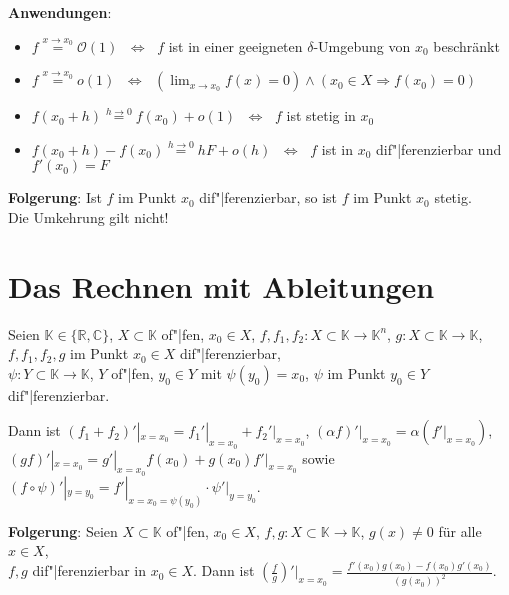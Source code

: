 \linie

\textbf{Anwendungen}:
\begin{itemize}
    \item $f \overset{x \to x_0}{=} \mathcal{O}(1)$
    $\;\Leftrightarrow\;$ $f$ ist in einer geeigneten $\delta$-Umgebung
    von $x_0$ beschränkt

    \item $f \overset{x \to x_0}{=} o(1)$
    $\;\Leftrightarrow\;$ $(\lim_{x \to x_0} f(x) = 0) \land
    (x_0 \in X \Rightarrow f(x_0) = 0)$

    \item $f(x_0 + h) \overset{h \to 0}{=} f(x_0) + o(1)$
    $\;\Leftrightarrow\;$ $f$ ist stetig in $x_0$

    \item $f(x_0 + h) - f(x_0) \overset{h \to 0}{=} hF + o(h)$
    $\;\Leftrightarrow\;$ $f$ ist in $x_0$ dif"|ferenzierbar und $f'(x_0) = F$
\end{itemize}

\textbf{Folgerung}:
Ist $f$ im Punkt $x_0$ dif"|ferenzierbar, so ist $f$ im Punkt $x_0$ stetig. \\
Die Umkehrung gilt nicht!

\section{%
    Das Rechnen mit Ableitungen%
}

Seien $\mathbb{K} \in \{\mathbb{R}, \mathbb{C}\}$, $X \subset \mathbb{K}$
of"|fen, $x_0 \in X$, \quad
$f, f_1, f_2: X \subset \mathbb{K} \rightarrow \mathbb{K}^n$,
$g: X \subset \mathbb{K} \rightarrow \mathbb{K}$, \\
$f, f_1, f_2, g$ im Punkt $x_0 \in X$ dif"|ferenzierbar, \\
$\psi: Y \subset \mathbb{K} \rightarrow \mathbb{K}$, $Y$ of"|fen, $y_0 \in Y$
mit $\psi(y_0) = x_0$, $\psi$ im Punkt $y_0 \in Y$ dif"|ferenzierbar.

Dann ist $(f_1 + f_2)'|_{x=x_0} = f_1'|_{x=x_0} + f_2'|_{x=x_0}$, \quad
$(\alpha f)'|_{x=x_0} = \alpha (f'|_{x=x_0})$, \\
$(gf)'|_{x=x_0} = g'|_{x=x_0} f(x_0) + g(x_0) f'|_{x=x_0}$ \quad sowie \quad
$(f \circ \psi)'|_{y=y_0} = f'|_{x=x_0=\psi(y_0)} \cdot \psi'|_{y=y_0}$.

\textbf{Folgerung}: Seien $X \subset \mathbb{K}$ of"|fen, $x_0 \in X$,
$f, g: X \subset \mathbb{K} \rightarrow \mathbb{K}$, $g(x) \not= 0$ für
alle $x \in X$, \\
$f, g$ dif"|ferenzierbar in $x_0 \in X$. \quad
Dann ist {\large $\left(\frac{f}{g}\right)'\Big|_{x=x_0} =
\frac{f'(x_0) g(x_0) - f(x_0) g'(x_0)}{(g(x_0))^2}$}.

